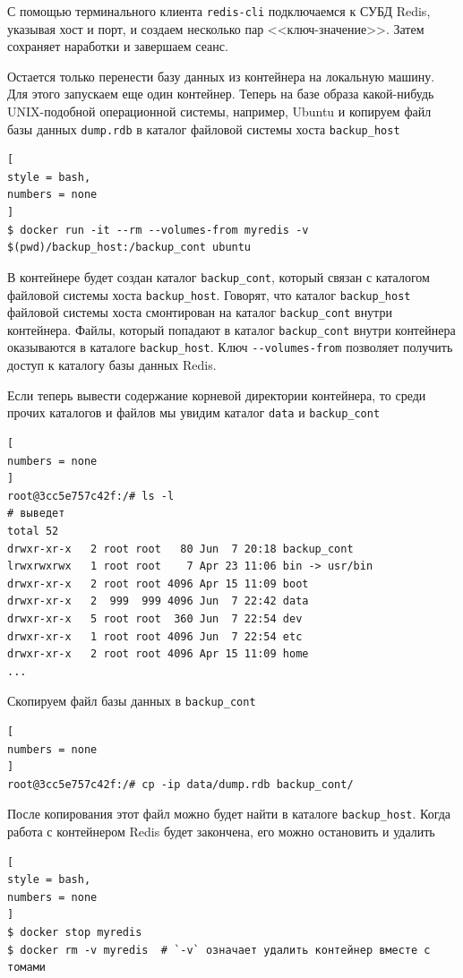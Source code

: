 \documentclass[%
	11pt,
	a4paper,
	utf8,
		]{article}
\begin{document}
С помощью терминального клиента \texttt{redis-cli} подключаемся к СУБД Redis, указывая хост и порт, и создаем несколько пар <<ключ-значение>>. Затем сохраняет наработки и завершаем сеанс.

Остается только перенести базу данных из контейнера на локальную машину. Для этого запускаем еще один контейнер. Теперь на базе образа какой-нибудь UNIX-подобной операционной системы, например, Ubuntu и копируем файл базы данных \texttt{dump.rdb} в каталог файловой системы хоста \texttt{backup\_host}
\begin{lstlisting}[
style = bash,
numbers = none
]
$ docker run -it --rm --volumes-from myredis -v $(pwd)/backup_host:/backup_cont ubuntu
\end{lstlisting}

В контейнере будет создан каталог \texttt{backup\_cont}, который связан с каталогом файловой системы хоста \texttt{backup\_host}. Говорят, что каталог \texttt{backup\_host} файловой системы хоста смонтирован на каталог \texttt{backup\_cont} внутри контейнера. Файлы, который попадают в каталог \texttt{backup\_cont} внутри контейнера оказываются в каталоге \texttt{backup\_host}. Ключ \verb|--volumes-from| позволяет получить доступ к каталогу базы данных Redis.

Если теперь вывести содержание корневой директории контейнера, то среди прочих каталогов и файлов мы увидим каталог \texttt{data} и \texttt{backup\_cont}
\begin{lstlisting}[
numbers = none
]
root@3cc5e757c42f:/# ls -l
# выведет
total 52
drwxr-xr-x   2 root root   80 Jun  7 20:18 backup_cont
lrwxrwxrwx   1 root root    7 Apr 23 11:06 bin -> usr/bin
drwxr-xr-x   2 root root 4096 Apr 15 11:09 boot
drwxr-xr-x   2  999  999 4096 Jun  7 22:42 data
drwxr-xr-x   5 root root  360 Jun  7 22:54 dev
drwxr-xr-x   1 root root 4096 Jun  7 22:54 etc
drwxr-xr-x   2 root root 4096 Apr 15 11:09 home
...
\end{lstlisting}

Скопируем файл базы данных в \texttt{backup\_cont}
\begin{lstlisting}[
numbers = none
]
root@3cc5e757c42f:/# cp -ip data/dump.rdb backup_cont/
\end{lstlisting}

После копирования этот файл можно будет найти в каталоге \texttt{backup\_host}. Когда работа с контейнером Redis будет закончена, его можно остановить и удалить
\begin{lstlisting}[
style = bash,
numbers = none
]
$ docker stop myredis
$ docker rm -v myredis  # `-v` означает удалить контейнер вместе с томами
\end{lstlisting}
\end{document}
